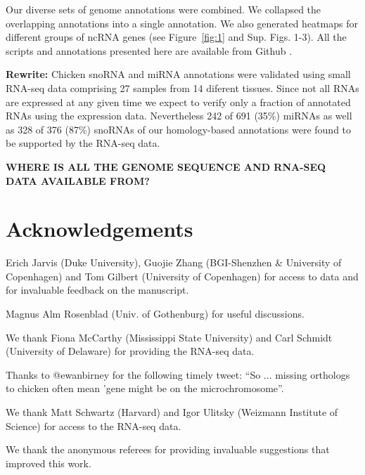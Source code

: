 \documentclass[10pt]{bmc_article}
\newcommand {\ppg}[1]{\textcolor{blue}{#1}}
\newenvironment{bmcformat}{\begin{raggedright}\baselineskip20pt\sloppy\setboolean{publ}{false}}{\end{raggedright}\baselineskip20pt\sloppy}
\begin{document}
\begin{bmcformat}

Our diverse sets of genome annotations were combined. We collapsed the
overlapping annotations into a single annotation. We also generated
heatmaps for different groups of ncRNA genes (see Figure~\ref{fig:1}
and Sup. Figs. 1-3). All the scripts and annotations presented here
are available from Github \cite{gitrepo}.


{\bf Rewrite:}
Chicken snoRNA and miRNA annotations were validated using small
RNA-seq data comprising 27 samples from 14 diferent tissues. Since not
all RNAs are expressed at any given time we expect to verify only a
fraction of annotated RNAs using the expression data. Nevertheless 242
of 691 (35\%) miRNAs as well as 328 of 376 (87\%) snoRNAs of our
homology-based annotations were found to be supported by the RNA-seq
data.

{\bf WHERE IS ALL THE GENOME SEQUENCE AND RNA-SEQ DATA AVAILABLE
  FROM?}

\section*{Acknowledgements}

Erich Jarvis (Duke University), Guojie Zhang (BGI-Shenzhen \&
University of Copenhagen) and Tom Gilbert (University of Copenhagen)
for access to data and for invaluable feedback on the manuscript.

Magnus Alm Rosenblad (Univ. of Gothenburg) for useful discussions.

We thank Fiona McCarthy (Mississippi State University) and Carl
Schmidt (University of Delaware) for providing the RNA-seq data.

Thanks to @ewanbirney for the following timely tweet: ``So ... missing
orthologs to chicken often mean 'gene might be on the
microchromosome''.

We thank Matt Schwartz (Harvard) and Igor Ulitsky (Weizmann Institute
of Science) for access to the RNA-seq data. 

We thank the anonymous referees for providing invaluable suggestions
that improved this work. 




\end{bmcformat}
\end{document}
